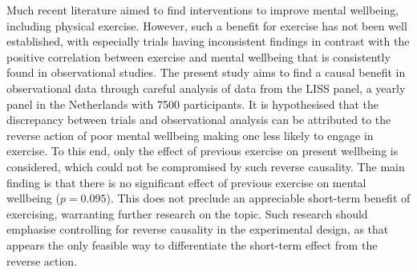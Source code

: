 Much recent literature aimed to find interventions to improve mental wellbeing, including physical exercise.
However, such a benefit for exercise has not been well established, with especially trials having inconsistent findings
in contrast with the positive correlation between exercise and mental wellbeing that is consistently found in observational
studies.
The present study aims to find a causal benefit in observational data through careful analysis of data from the
LISS panel, a yearly panel in the Netherlands with 7500 participants.
It is hypothesised that the discrepancy between trials and observational analysis can be attributed
to the reverse action of poor mental wellbeing making one less likely to engage in exercise.
To this end, only the effect of previous exercise on present wellbeing is considered, which could not be compromised
by such reverse causality.
The main finding is that there is no significant effect of previous exercise on mental wellbeing ($p = 0.095$).
This does not preclude an appreciable short-term benefit of exercising, warranting further research on the topic.
Such research should emphasise controlling for reverse causality in the experimental design, as that appears
the only feasible way to differentiate the short-term effect from the reverse action.
